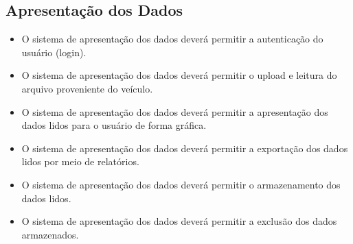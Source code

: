     \subsection{Apresentação dos Dados}

      \begin{itemize}
        \item O sistema de apresentação dos dados deverá permitir a autenticação do usuário (login).
        \item O sistema de apresentação dos dados deverá permitir o upload e leitura do arquivo proveniente do veículo.
        \item O sistema de apresentação dos dados deverá permitir a apresentação dos dados lidos para o usuário de forma gráfica.
        \item O sistema de apresentação dos dados deverá permitir a exportação dos dados lidos por meio de relatórios.
        \item O sistema de apresentação dos dados deverá permitir o armazenamento dos dados lidos.
        \item O sistema de apresentação dos dados deverá permitir a exclusão dos dados armazenados.
      \end{itemize}
